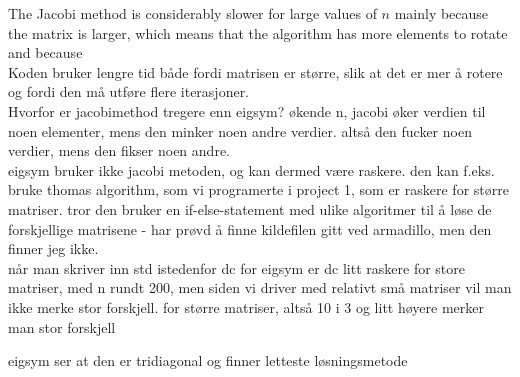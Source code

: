 \documentclass{article}
\begin{document}
\begin{multicols}{2}



  The Jacobi method is considerably slower for large values of $n$ mainly because the matrix is larger, which means that the algorithm has more elements to rotate and because
  \\

  Koden bruker lengre tid både fordi matrisen er større, slik at det er mer å rotere og fordi den må
  utføre flere iterasjoner. \\

  Hvorfor er jacobimethod tregere enn eigsym? økende n, jacobi øker verdien til noen elementer, mens den minker noen andre verdier. altså den fucker noen verdier, mens den fikser noen andre. \\

  eigsym bruker ikke jacobi metoden, og kan dermed være raskere. den kan f.eks. bruke thomas algorithm, som vi programerte i project 1, som er raskere for større matriser. tror den bruker en if-else-statement med ulike algoritmer til å løse de forskjellige matrisene - har prøvd å finne kildefilen gitt ved armadillo, men den finner jeg ikke. \\

  når man skriver inn std istedenfor dc for eigsym er dc litt raskere for store matriser, med n rundt 200, men siden vi driver med relativt små matriser vil man ikke merke stor forskjell. for større matriser, altså 10 i 3 og litt høyere merker man stor forskjell

  eigsym ser at den er tridiagonal og finner letteste løsningsmetode


\vspace{3cm}

\end{multicols}
\end{document}

